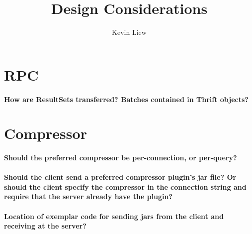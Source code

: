 \documentclass[11pt,a4paper]{article}
\title{Design Considerations}
\author{Kevin Liew}
\begin{document}
\maketitle

\section{RPC}
	\paragraph{How are ResultSets transferred? Batches contained in Thrift objects?} 

\section{Compressor}
	\paragraph{Should the preferred compressor be per-connection, or per-query?}

	\paragraph{Should the client send a preferred compressor plugin's jar file? Or should the client specify the compressor in the connection string and require that the server already have the plugin?}
		
	\paragraph{Location of exemplar code for sending jars from the client and receiving at the server?}
\end{document}
